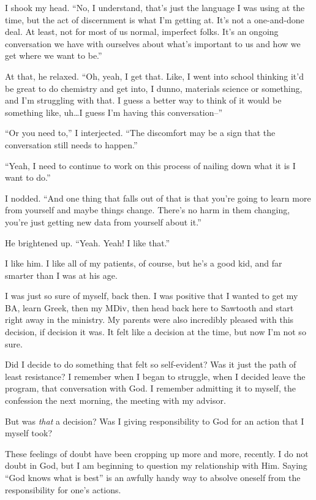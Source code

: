 I shook my head. ``No, I understand, that's just the language I was using at the time, but the act of discernment is what I'm getting at. It's not a one-and-done deal. At least, not for most of us normal, imperfect folks. It's an ongoing conversation we have with ourselves about what's important to us and how we get where we want to be.''

At that, he relaxed. ``Oh, yeah, I get that. Like, I went into school thinking it'd be great to do chemistry and get into, I dunno, materials science or something, and I'm struggling with that. I guess a better way to think of it would be something like, uh\ldots I guess I'm having this conversation--''

``Or you need to,'' I interjected. ``The discomfort may be a sign that the conversation still needs to happen.''

``Yeah, I need to continue to work on this process of nailing down what it is I want to do.''

I nodded. ``And one thing that falls out of that is that you're going to learn more from yourself and maybe things change. There's no harm in them changing, you're just getting new data from yourself about it.''

He brightened up. ``Yeah. Yeah! I like that.''

I like him. I like all of my patients, of course, but he's a good kid, and far smarter than I was at his age.

I was just so sure of myself, back then. I was positive that I wanted to get my BA, learn Greek, then my MDiv, then head back here to Sawtooth and start right away in the ministry. My parents were also incredibly pleased with this decision, if decision it was. It felt like a decision at the time, but now I'm not so sure.

Did I decide to do something that felt so self-evident? Was it just the path of least resistance? I remember when I began to struggle, when I decided leave the program, that conversation with God. I remember admitting it to myself, the confession the next morning, the meeting with my advisor.

But was \emph{that} a decision? Was I giving responsibility to God for an action that I myself took?

These feelings of doubt have been cropping up more and more, recently. I do not doubt in God, but I am beginning to question my relationship with Him. Saying ``God knows what is best'' is an awfully handy way to absolve oneself from the responsibility for one's actions.

